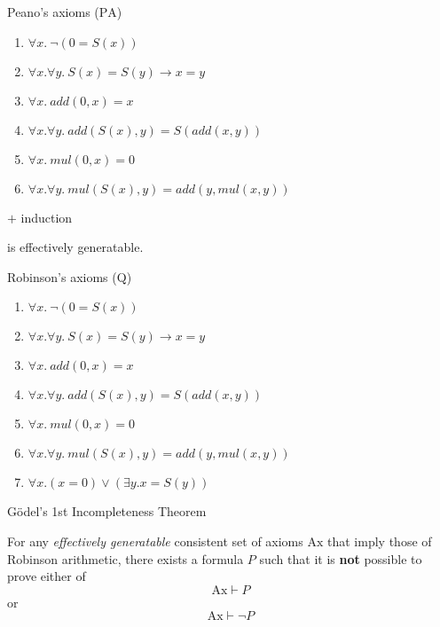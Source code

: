 \documentclass[xetex,aspectratio=169,14pt,hyperref={pdfpagelabels=true,pdflang={en-GB}}]{beamer}
\begin{document}
\begin{frame}
  {Peano's axioms ($\mathrm{PA}$)}

  \begin{enumerate}
  \item $\forall x.~\lnot(0 = S(x))$
  \item $\forall x. \forall y.~S(x) = S(y) \to x = y$
  \item $\forall x.~add(0,x) = x$
  \item $\forall x.\forall y.~add(S(x),y) = S(add(x,y))$
  \item $\forall x.~mul(0,x) = 0$
  \item $\forall x. \forall y.~mul(S(x),y) = add(y,mul(x,y))$
  \end{enumerate}
  $+$ induction

  \bigskip

  is effectively generatable.
\end{frame}

\begin{frame}
  {Robinson's axioms ($\mathrm{Q}$)}

  \begin{enumerate}
  \item $\forall x.~\lnot(0 = S(x))$
  \item $\forall x. \forall y.~S(x) = S(y) \to x = y$
  \item $\forall x.~add(0,x) = x$
  \item $\forall x.\forall y.~add(S(x),y) = S(add(x,y))$
  \item $\forall x.~mul(0,x) = 0$
  \item $\forall x. \forall y.~mul(S(x),y) = add(y,mul(x,y))$
  \item $\forall x. (x = 0) \lor (\exists y. x = S(y))$
  \end{enumerate}
\end{frame}

\begin{frame}
  {G{\"o}del's 1st Incompleteness Theorem}

  For any \emph{effectively generatable} consistent set of axioms
  $\mathrm{Ax}$ that imply those of Robinson arithmetic, there exists
  a formula $P$ such that it is \textbf{not} possible to prove either
  of
  \begin{displaymath}
    \mathrm{Ax} \vdash P
  \end{displaymath}
  or
  \begin{displaymath}
    \mathrm{Ax} \vdash \lnot P
  \end{displaymath}
\end{frame}
\end{document}

